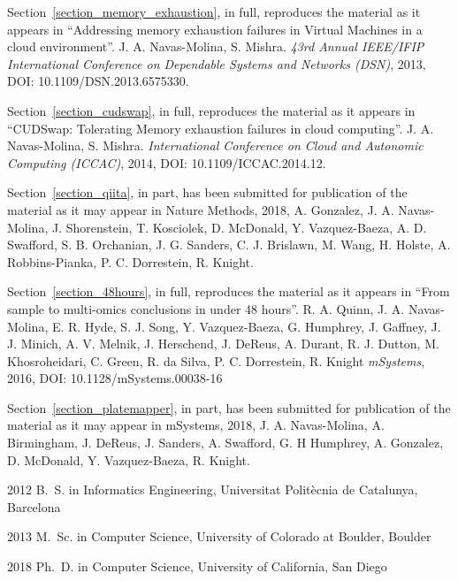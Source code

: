 \begin{frontmatter}
\begin{acknowledgements}
    Section~\ref{section_memory_exhaustion}, in full, reproduces the material as it
    appears in ``Addressing memory exhaustion failures in Virtual Machines in a cloud environment''.
    J. A. Navas-Molina, S. Mishra. \emph{43rd Annual IEEE/IFIP International Conference on Dependable Systems and Networks (DSN)},
    2013, DOI: 10.1109/DSN.2013.6575330.

    Section~\ref{section_cudswap}, in full, reproduces the material as it
    appears in ``CUDSwap: Tolerating Memory exhaustion failures in cloud computing''.
    J. A. Navas-Molina, S. Mishra. \emph{International Conference on Cloud and Autonomic Computing (ICCAC)},
    2014, DOI: 10.1109/ICCAC.2014.12.

    Section~\ref{section_qiita}, in part, has been submitted for publication of the
    material as it may appear in Nature Methods, 2018, A. Gonzalez, J. A. Navas-Molina,
    J. Shorenstein, T. Kosciolek, D. McDonald, Y. Vazquez-Baeza, A. D. Swafford,
    S. B. Orchanian, J. G. Sanders, C. J. Brislawn, M. Wang, H. Holste, A. Robbins-Pianka,
    P. C. Dorrestein, R. Knight.

    Section~\ref{section_48hours}, in full, reproduces the material as it
    appears in ``From sample to multi-omics conclusions in under 48 hours''.
    R. A. Quinn, J. A. Navas-Molina, E. R. Hyde, S. J. Song, Y. Vazquez-Baeza,
    G. Humphrey, J. Gaffney, J. J. Minich, A. V. Melnik, J. Herschend, J. DeReus,
    A. Durant, R. J. Dutton, M. Khosroheidari, C. Green, R. da Silva, P. C. Dorrestein,
    R. Knight \emph{mSystems}, 2016, DOI: 10.1128/mSystems.00038-16

    Section~\ref{section_platemapper}, in part, has been submitted for publication of the
    material as it may appear in mSystems, 2018, J. A. Navas-Molina, A. Birmingham,
    J. DeReus, J. Sanders, A. Swafford, G. H Humphrey, A. Gonzalez, D. McDonald,
    Y. Vazquez-Baeza, R. Knight.

\end{acknowledgements}


%
%
\begin{vitapage}
\begin{vita}
  \item[2012] B.~S. in Informatics Engineering, Universitat Polit\`ecnia de Catalunya, Barcelona
  \item[2013] M.~Sc. in Computer Science, University of Colorado at Boulder, Boulder
  \item[2018] Ph.~D. in Computer Science, University of California, San Diego
\end{vita}



\end{vitapage}
\end{frontmatter}
